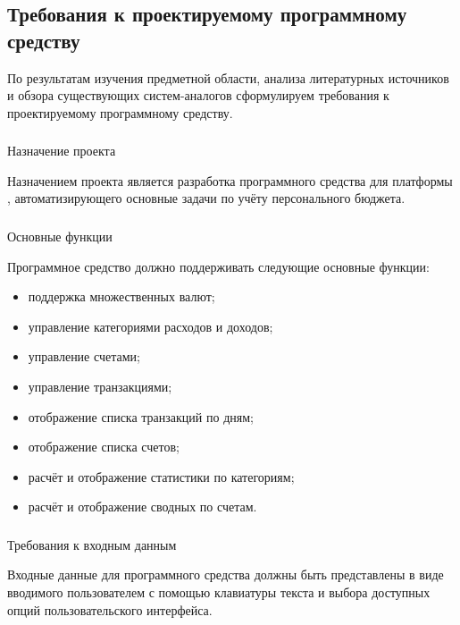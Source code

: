 \subsection{Требования к проектируемому программному средству}
\label{sec:analysis:specification}

По результатам изучения предметной области, анализа литературных источников и обзора существующих систем-аналогов сформулируем требования к проектируемому программному средству.

\subsubsection{} Назначение проекта
\label{sec:analysis:specification:purpose}

Назначением проекта является разработка программного средства для платформы \andro, автоматизирующего основные задачи по учёту персонального бюджета.

\subsubsection{} Основные функции
\label{sec:analysis:specification:functions}

Программное средство должно поддерживать следующие основные фун\-к\-ции:

\begin{itemize}
    \item поддержка множественных валют;
    \item управление категориями расходов и доходов;
    \item управление счетами;
    \item управление транзакциями;
    \item отображение списка транзакций по дням;
    \item отображение списка счетов;
    \item расчёт и отображение статистики по категориям;
    \item расчёт и отображение сводных по счетам.
\end{itemize}

\subsubsection{} Требования к входным данным
\label{sec:analysis:specification:inputs}

Входные данные для программного средства должны быть представлены в виде вводимого пользователем с помощью клавиатуры текста и выбора доступных опций пользовательского интерфейса.

